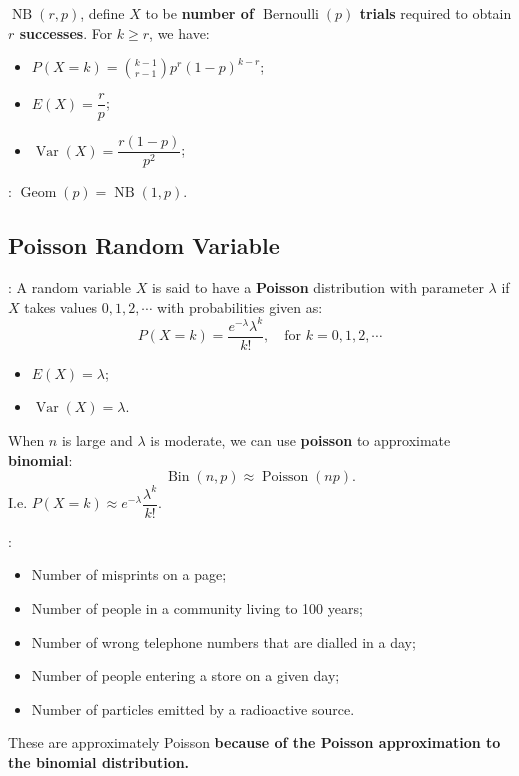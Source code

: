  \(\operatorname{NB}
\left(r,p\right)\), define \(X\) to be \textbf{number of
\(\operatorname{Bernoulli}\left(p\right)\) trials} required to obtain 
\textbf{$r$ successes}. For \(k \geq r\), we have:
\begin{itemize}
  \item \(P(X=k) = \binom{k-1}{r-1}p^r(1-p)^{k-r}\);
\end{itemize}
\begin{multicols}{2}
\begin{itemize}
  \item \(E(X)=\dfrac{r}{p}\);
  \item \(\operatorname{Var}\left(X\right)=\dfrac{r(1-p)}{p^2}\);
\end{itemize}
\end{multicols}

: \(\operatorname{Geom}\left(p\right)=
\operatorname{NB}\left(1,p\right).\)

\subsection{Poisson Random Variable}

: A random variable \(X\) is said to have a \textbf{Poisson} 
distribution with parameter \(\lambda\) if \(X\) takes values 
\(0, 1, 2, \cdots\) with probabilities given as:
\begin{equation*}
  P(X = k) = \dfrac{e^{-\lambda}\lambda^k}{k!}, \quad \text{for }k=0, 1, 2, 
  \cdots
\end{equation*}
\begin{multicols}{2}
\begin{itemize}
  \item \(E(X)=\lambda\);
  \item \(\operatorname{Var}\left(X\right)=\lambda\).
\end{itemize}
\end{multicols}
When \(n\) is large and \(\lambda\) is moderate, we can use \textbf{poisson} to
approximate \textbf{binomial}:
\begin{equation*}
  \operatorname{Bin}\left(n,p\right) \approx \operatorname{Poisson}
  \left(np\right).
\end{equation*}
I.e. \(P(X = k)\approx e^{-\lambda}\dfrac{\lambda^k}{k!}\).

:
\begin{itemize}
  \item Number of misprints on a page;
  \item Number of people in a community living to 100 years;
  \item Number of wrong telephone numbers that are dialled in a day;
  \item Number of people entering a store on a given day;
  \item Number of particles emitted by a radioactive source.
\end{itemize}
These are approximately Poisson \textbf{because of the Poisson approximation 
to the binomial distribution.}

